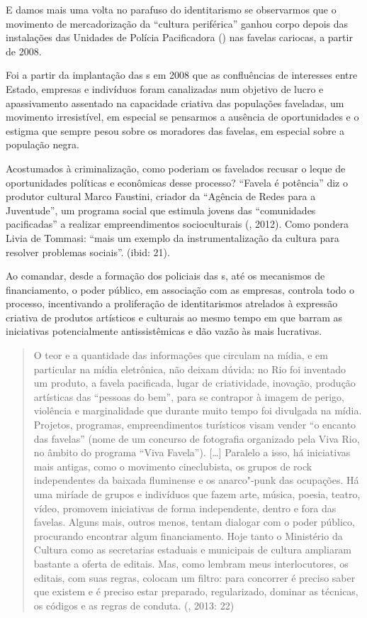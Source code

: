 E damos mais uma volta no parafuso do identitarismo se observarmos que o
movimento de mercadorização da ``cultura periférica'' ganhou corpo
depois das instalações das Unidades de Polícia Pacificadora () nas
favelas cariocas, a partir de 2008.

Foi a partir da implantação das s em 2008 que as confluências de
interesses entre Estado, empresas e indivíduos foram canalizadas num
objetivo de lucro e apassivamento assentado na capacidade criativa das
populações faveladas, um movimento irresistível, em especial se
pensarmos a ausência de oportunidades e o estigma que sempre pesou sobre
os moradores das favelas, em especial sobre a população negra.

Acostumados à criminalização, como poderiam os favelados recusar o leque
de oportunidades políticas e econômicas desse processo? ``Favela é
potência'' diz o produtor cultural Marco Faustini, criador da ``Agência
de Redes para a Juventude'', um programa social que estimula jovens das
``comunidades pacificadas'' a realizar empreendimentos socioculturais
(, 2012). Como pondera Livia de Tommasi: ``mais um exemplo da
instrumentalização da cultura para resolver problemas sociais''. (ibid:
21).

Ao comandar, desde a formação dos policiais das s, até os mecanismos
de financiamento, o poder público, em associação com as empresas,
controla todo o processo, incentivando a proliferação de identitarismos
atrelados à expressão criativa de produtos artísticos e culturais ao
mesmo tempo em que barram as iniciativas potencialmente antissistêmicas
e dão vazão às mais lucrativas.

\begin{quote}
O teor e a quantidade das informações que circulam na mídia, e em
particular na mídia eletrônica, não deixam dúvida: no Rio foi inventado
um produto, a favela pacificada, lugar de criatividade, inovação,
produção artísticas das ``pessoas do bem'', para se contrapor à imagem
de perigo, violência e marginalidade que durante muito tempo foi
divulgada na mídia. Projetos, programas, empreendimentos turísticos
visam vender ``o encanto das favelas'' (nome de um concurso de
fotografia organizado pela  Viva Rio, no âmbito do programa ``Viva
Favela''). {[}\ldots{}{]} Paralelo a isso, há iniciativas mais antigas, como
o movimento cineclubista, os grupos de rock independentes da baixada
fluminense e os anarco"-punk das ocupações. Há uma miríade de grupos e
indivíduos que fazem arte, música, poesia, teatro, vídeo, promovem
iniciativas de forma independente, dentro e fora das favelas. Alguns
mais, outros menos, tentam dialogar com o poder público, procurando
encontrar algum financiamento. Hoje tanto o Ministério da Cultura como
as secretarias estaduais e municipais de cultura ampliaram bastante a
oferta de editais. Mas, como lembram meus interlocutores, os editais,
com suas regras, colocam um filtro: para concorrer é preciso saber que
existem e é preciso estar preparado, regularizado, dominar as técnicas,
os códigos e as regras de conduta. (, 2013: 22)
\end{quote}


